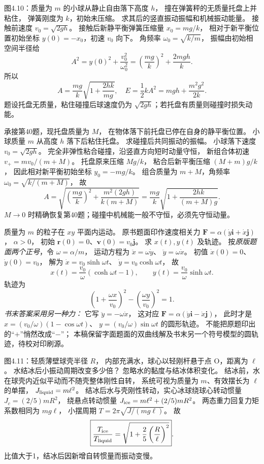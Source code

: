 图4.10：质量为 $m$ 的小球从静止自由落下高度 $h$，
撞在弹簧秤的无质量托盘上并粘住，
弹簧刚度为 $k$，初始未压缩。
求其后的竖直振动振幅和机械振动能量。
\exsolution
接触前速度
$v_0=\sqrt{2gh}$。
接触后新静平衡弹簧压缩量
$x_0=mg/k$，
相对于新平衡位置初始坐标
$y(0)=-x_0$，初速 $v_0$ 向下。
角频率 $\omega_0=\sqrt{k/m}$，
振幅由初始相空间半径给
\[
A^2=y(0)^2+\frac{v_0^2}{\omega_0^2}
=\left(\frac{mg}{k}\right)^2+\frac{2mgh}{k}.
\]
所以
\[
\boxed{A=\frac{mg}{k}
\sqrt{1+\frac{2hk}{mg}}},
\quad
\boxed{E=\frac12kA^2
=mgh+\frac{m^2g^2}{2k}}.
\]
\excheck 题设托盘无质量，粘住碰撞后球速度仍为
$\sqrt{2gh}$；若托盘有质量则碰撞时损失动能。

承接第40题，现托盘质量为 $M$，
在物体落下前托盘已停在自身的静平衡位置。
小球质量 $m$ 从高度 $h$ 落下后粘住托盘。
求碰撞后共同振动的振幅。
\exsolution
小球落下速度 $v_0=\sqrt{2gh}$。
完全非弹性粘合碰撞，沿竖直方向短时动量守恒，
新组合体初速
$v_+=m v_0/(m+M)$。
托盘原来压缩 $Mg/k$，
粘合后新平衡压缩
$(M+m)g/k$，
因此相对新平衡初始坐标
$y_0=-mg/k$。
组合质量为 $m+M$，角频率
$\omega_0=\sqrt{k/(m+M)}$，
故
\[
\boxed{A=
\sqrt{\left(\frac{mg}{k}\right)^2+
\frac{m^2(2gh)}{k(m+M)}}
=\frac{mg}{k}
\sqrt{1+\frac{2hk}{(m+M)g}}}.
\]
\excheck $M\to0$ 时精确恢复第40题；碰撞中机械能一般不守恒，必须先守恒动量。

质量为 $m$ 的粒子在 $xy$ 平面内运动。
原书题面印作速度相关力
$\bm F=\alpha(\dot y\bm i+\dot x\bm j)$，
$\alpha>0$，
初始 $\bm r(0)=0$、$\bm v(0)=v_0\bm j$。
求 $x(t),y(t)$ 及轨迹。
\exsolution
按\emph{原版题面两个正号}，令
$\omega=\alpha/m$，
运动方程为
$\ddot x=\omega\dot y$、
$\ddot y=\omega\dot x$。
初值 $\dot x(0)=0$、$\dot y(0)=v_0$，
解为
$\dot x=v_0\sinh\omega t$、
$\dot y=v_0\cosh\omega t$，
故
\[
\boxed{x(t)=\frac{v_0}{\omega}
(\cosh\omega t-1),\qquad
y(t)=\frac{v_0}{\omega}\sinh\omega t}.
\]
轨迹为
\[
\boxed{\left(1+\frac{\omega x}{v_0}\right)^2-
\left(\frac{\omega y}{v_0}\right)^2=1}.
\]
\emph{书末答案采用另一种力：}
它写
$\ddot y=-\omega\dot x$，
这对应
$\bm F=\alpha(\dot y\bm i-\dot x\bm j)$，
此时才是
$x=(v_0/\omega)(1-\cos\omega t)$、
$y=(v_0/\omega)\sin\omega t$
的圆形轨迹。
\excheck 不能把原题印出的“$+$”悄然改成“$-$”；
本稿保留字面题面的双曲线解及书末另一个符号模型的圆轨迹，待校对印刷源。

图4.11：轻质薄壁球壳半径 $R$，
内部充满水，球心以轻刚杆悬于点 O，距离为 $\ell$。
水结冰后小振动周期改变多少倍？
忽略水的黏度与结冰体积变化。
\exsolution
结冰前，水在球壳内近似平动而不随壳整体刚性自转，
系统可视为质量为 $m$、有效摆长为 $\ell$ 的单摆，
$J_{\rm liquid}=m\ell^2$。
结冰后水与壳刚性转动，实心冰球绕球心转动惯量
$J_c=(2/5)mR^2$，
绕悬点转动惯量
$J_{\rm ice}=m\ell^2+(2/5)mR^2$。
两态重力回复力矩系数相同为 $mg\ell$，
小摆周期 $T=2\pi\sqrt{J/(mg\ell)}$。
故
\[
\boxed{\frac{T_{\rm ice}}{T_{\rm liquid}}
=\sqrt{1+\frac25\left(\frac R\ell\right)^2}}.
\]
\excheck 比值大于1，结冰后因新增自转惯量而振动变慢。

